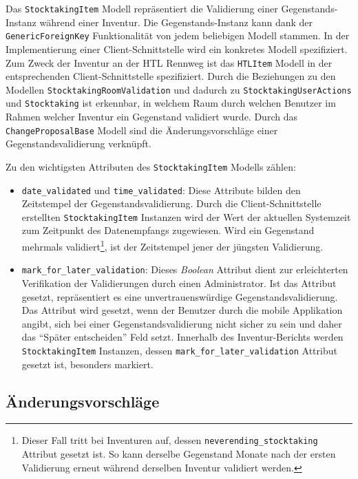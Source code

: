Das \texttt{StocktakingItem} Modell repräsentiert die Validierung einer
Gegenstands-Instanz während einer Inventur. Die Gegenstands-Instanz kann
dank der \texttt{GenericForeignKey} Funktionalität
\cite{django-doku-contenttypes} von jedem beliebigen Modell stammen. In
der Implementierung einer Client-Schnittstelle wird ein konkretes Modell
spezifiziert. Zum Zweck der Inventur an der HTL Rennweg ist das
\texttt{HTLItem} Modell in der entsprechenden Client-Schnittstelle
spezifiziert. Durch die Beziehungen zu den Modellen
\texttt{StocktakingRoomValidation} und dadurch zu
\texttt{StocktakingUserActions} und \texttt{Stocktaking} ist erkennbar,
in welchem Raum durch welchen Benutzer im Rahmen welcher Inventur ein
Gegenstand validiert wurde. Durch das \texttt{ChangeProposalBase} Modell
sind die Änderungsvorschläge einer Gegenstandsvalidierung verknüpft.

Zu den wichtigsten Attributen des \texttt{StocktakingItem} Modells
zählen:

\begin{itemize}
\tightlist
\item
  \texttt{date\_validated} und \texttt{time\_validated}: Diese Attribute
  bilden den Zeitstempel der Gegenstandsvalidierung. Durch die
  Client-Schnittstelle erstellten \texttt{StocktakingItem} Instanzen
  wird der Wert der aktuellen Systemzeit zum Zeitpunkt des Datenempfangs
  zugewiesen. Wird ein Gegenstand mehrmals validiert\footnote{Dieser
    Fall tritt bei Inventuren auf, dessen
    \texttt{neverending\_stocktaking} Attribut gesetzt ist. So kann
    derselbe Gegenstand Monate nach der ersten Validierung erneut
    während derselben Inventur validiert werden.}, ist der Zeitstempel
  jener der jüngsten Validierung.
\item
  \texttt{mark\_for\_later\_validation}: Dieses
  \emph{Boolean}
  Attribut dient zur erleichterten Verifikation der Validierungen durch
  einen Administrator. Ist das Attribut gesetzt, repräsentiert es eine
  unvertrauenswürdige Gegenstandsvalidierung. Das Attribut wird gesetzt,
  wenn der Benutzer durch die mobile Applikation angibt, sich bei einer
  Gegenstandsvalidierung nicht sicher zu sein und daher das ``Später
  entscheiden'' Feld setzt. Innerhalb des Inventur-Berichts werden
  \texttt{StocktakingItem} Instanzen, dessen
  \texttt{mark\_for\_later\_validation} Attribut gesetzt ist, besonders
  markiert.
\end{itemize}

\hypertarget{uxe4nderungsvorschluxe4ge}{%
\subsection{Änderungsvorschläge}\label{uxe4nderungsvorschluxe4ge}}

